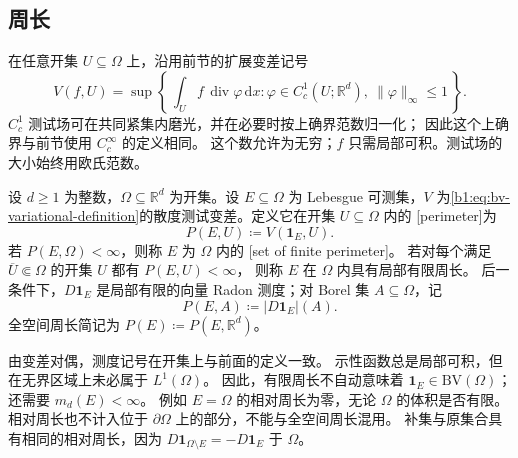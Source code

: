 \subsection{周长}
\label{b1:subsec:270302}

在任意开集 \(U\subseteq\Omega\) 上，沿用前节的扩展变差记号
\[
 V(f,U)=\sup\left\{\,
     \int_U f\,\operatorname{div}\varphi\,\mathrm dx:
     \varphi\in C_c^1(U;\mathbb R^d),\
     \|\varphi\|_\infty\le1\,\right\}.
\]
\(C_c^1\) 测试场可在共同紧集内磨光，并在必要时按上确界范数归一化；
因此这个上确界与前节使用 \(C_c^\infty\) 的定义相同。
这个数允许为无穷；\(f\) 只需局部可积。测试场的大小始终用欧氏范数。

\begin{definition}\label{b1:def:perimeter}
设 \(d\ge1\) 为整数，\(\Omega\subseteq\mathbb R^d\) 为开集。设 \(E\subseteq\Omega\) 为 Lebesgue 可测集，\(V\) 为\eqref{b1:eq:bv-variational-definition}的散度测试变差。定义它在开集 \(U\subseteq\Omega\) 内的%
\term[zhouchang]{周长}[perimeter]为
\[
 P(E,U)\coloneqq V(\mathbf1_E,U).
\]
若 \(P(E,\Omega)<\infty\)，则称 \(E\) 为 \(\Omega\) 内的%
[set of finite perimeter]。
若对每个满足 \(\overline U\Subset\Omega\) 的开集 \(U\) 都有 \(P(E,U)<\infty\)，
则称 \(E\) 在 \(\Omega\) 内具有局部有限周长。
后一条件下，\(D\mathbf1_E\) 是局部有限的向量 Radon 测度；对 Borel 集 \(A\subseteq\Omega\)，记
\[
 P(E,A)\coloneqq|D\mathbf1_E|(A).
\]
全空间周长简记为 \(P(E)\coloneqq P(E,\mathbb R^d)\)。
\end{definition}

由变差对偶，测度记号在开集上与前面的定义一致。
示性函数总是局部可积，但在无界区域上未必属于 \(L^1(\Omega)\)。
因此，有限周长不自动意味着 \(\mathbf1_E\in \mathrm{BV}(\Omega)\)；还需要 \(m_d(E)<\infty\)。
例如 \(E=\Omega\) 的相对周长为零，无论 \(\Omega\) 的体积是否有限。
相对周长也不计入位于 \(\partial\Omega\) 上的部分，不能与全空间周长混用。
补集与原集合具有相同的相对周长，因为
\(D\mathbf1_{\Omega\setminus E}=-D\mathbf1_E\) 于 \(\Omega\)。

